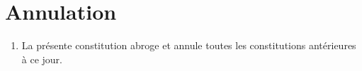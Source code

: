 \section{Annulation}
\label{annulation}

\begin{enumerate}
 \item La présente constitution abroge et annule toutes les constitutions antérieures à ce jour.
\end{enumerate}
